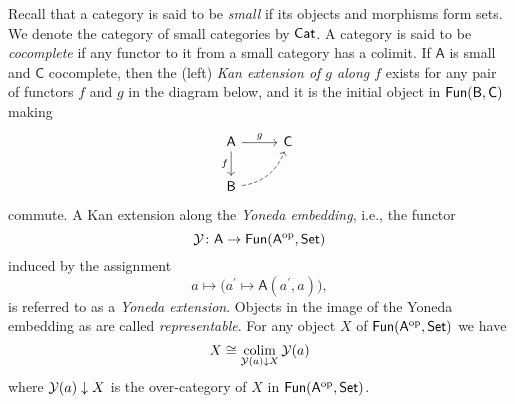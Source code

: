 Recall that a category is said to be \textit{small} if its objects and morphisms form sets.
We denote the category of small categories by $\mathsf{Cat}$.
A category is said to be \textit{cocomplete} if any functor to it from a small category has a colimit.
If $\mathsf{A}$ is small and $\mathsf{C}$ cocomplete, then the (left) \textit{Kan extension of $g$ along $f$} exists for any pair of functors $f$ and $g$ in the diagram below, and it is the initial object in $\mathsf{Fun}(\mathsf{B}, \mathsf{C})$ making
\begin{equation*}
\begin{tikzcd}[column sep=normal, row sep=normal]
\mathsf{A} \arrow[d, "f"'] \arrow[r, "g"] & \mathsf{C} \\
\sB \arrow[dashed, ur, bend right] & \quad
\end{tikzcd}
\end{equation*}
commute.
A Kan extension along the \textit{Yoneda embedding}, i.e., the functor
\[
\mathcal{Y} \colon \mathsf{A} \to \mathsf{Fun}(\mathsf{A}^{\mathrm{op}}, \mathsf{Set})
\]
induced by the assignment
\[
a \mapsto \big( a^\prime \mapsto \mathsf{A}(a^\prime, a) \big),
\]
is referred to as a \textit{Yoneda extension}.
Objects in the image of the Yoneda embedding as are called \textit{representable}.
For any object $X$ of $\mathsf{Fun}(\mathsf{A}^{\mathrm{op}}, \mathsf{Set})$ we have
\[
X \cong \operatorname*{colim}_{\mathcal{Y}(a) \downarrow X} \mathcal{Y}(a)
\]
where ${\mathcal{Y}(a) \downarrow X}$ is the over-category of $X$ in $\mathsf{Fun}(\mathsf{A}^{\mathrm{op}}, \mathsf{Set})$.

